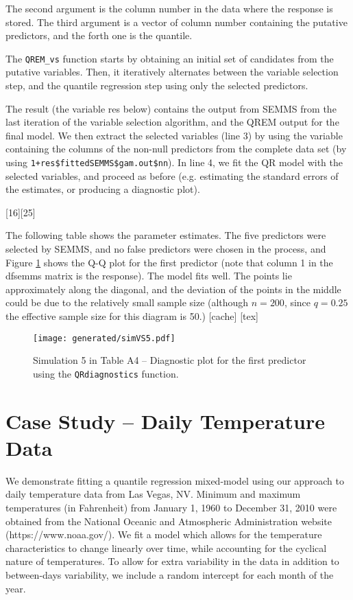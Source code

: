 \documentclass[a4paper,10pt]{article}
\begin{document}
The second argument is the column number in the data where the response is stored. The third argument is a vector of column number containing the putative predictors, and the forth one is the quantile.

The \texttt{QREM\_vs} function starts by obtaining an initial set of candidates from the putative variables. Then, it iteratively alternates between the variable selection step, and the quantile regression step using only the selected predictors.

The result (the variable res below) contains the output from SEMMS from the last iteration of the variable selection  algorithm, and the QREM output for the final model. We then extract the selected variables (line 3) by using the variable containing the columns of the non-null predictors from the complete data set (by using \texttt{1+res\$fittedSEMMS\$gam.out\$nn}).
In line 4, we fit the QR model with the selected variables, and proceed as before (e.g. estimating the standard errors of the estimates, or producing a diagnostic plot).

[16][25]

The following table shows the parameter estimates. The five predictors were selected by SEMMS, and no false predictors were chosen in the process, and Figure \ref{sim5vsqq} shows the Q-Q plot for the first predictor (note that column 1 in the dfsemms matrix is the response). The model fits well. The points lie approximately along the diagonal, and the deviation of the points in the middle could be due to the relatively small sample size (although $n=200$, since $q=0.25$ the effective sample size for this diagram is 50.)
[cache]
 [tex]	

\begin{figure}[b!]
\centering
\texttt{[image: generated/simVS5.pdf]}
\caption{Simulation 5 in Table A4 -- Diagnostic plot for the first predictor using the \texttt{QRdiagnostics} function.}\label{sim5vsqq}
\end{figure}
     
\section{Case Study -- Daily Temperature Data}
We demonstrate fitting a quantile regression mixed-model using our approach to daily temperature data from Las Vegas, NV. Minimum and maximum temperatures (in Fahrenheit) from January 1, 1960 to December 31, 2010 were obtained from the National Oceanic and Atmospheric Administration website (https://www.noaa.gov/).
We fit a  model which allows for the temperature characteristics to change linearly over time, while accounting for the cyclical nature of temperatures. To allow for extra variability in the data in addition to between-days variability, we include a random intercept for each month of the year.
\end{document}
